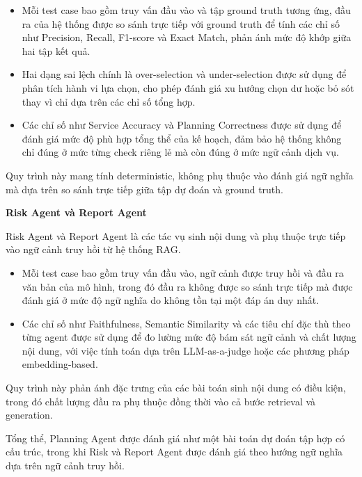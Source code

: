 \begin{itemize}
    \item Mỗi test case bao gồm truy vấn đầu vào và tập ground truth tương ứng, đầu ra của hệ thống được so sánh trực tiếp với ground truth để tính các chỉ số như Precision, Recall, F1-score và Exact Match, phản ánh mức độ khớp giữa hai tập kết quả.

    \item Hai dạng sai lệch chính là over-selection và under-selection được sử dụng để phân tích hành vi lựa chọn, cho phép đánh giá xu hướng chọn dư hoặc bỏ sót thay vì chỉ dựa trên các chỉ số tổng hợp.

    \item Các chỉ số như Service Accuracy và Planning Correctness được sử dụng để đánh giá mức độ phù hợp tổng thể của kế hoạch, đảm bảo hệ thống không chỉ đúng ở mức từng check riêng lẻ mà còn đúng ở mức ngữ cảnh dịch vụ.
\end{itemize}

Quy trình này mang tính deterministic, không phụ thuộc vào đánh giá ngữ nghĩa mà dựa trên so sánh trực tiếp giữa tập dự đoán và ground truth.

\vspace{0.5em}

\textbf{Risk Agent và Report Agent}

Risk Agent và Report Agent là các tác vụ sinh nội dung và phụ thuộc trực tiếp vào ngữ cảnh truy hồi từ hệ thống RAG.

\begin{itemize}
    \item Mỗi test case bao gồm truy vấn đầu vào, ngữ cảnh được truy hồi và đầu ra văn bản của mô hình, trong đó đầu ra không được so sánh trực tiếp mà được đánh giá ở mức độ ngữ nghĩa do không tồn tại một đáp án duy nhất.

    \item Các chỉ số như Faithfulness, Semantic Similarity và các tiêu chí đặc thù theo từng agent được sử dụng để đo lường mức độ bám sát ngữ cảnh và chất lượng nội dung, với việc tính toán dựa trên LLM-as-a-judge hoặc các phương pháp embedding-based.
\end{itemize}

Quy trình này phản ánh đặc trưng của các bài toán sinh nội dung có điều kiện, trong đó chất lượng đầu ra phụ thuộc đồng thời vào cả bước retrieval và generation.

\vspace{0.5em}

Tổng thể, Planning Agent được đánh giá như một bài toán dự đoán tập hợp có cấu trúc, trong khi Risk và Report Agent được đánh giá theo hướng ngữ nghĩa dựa trên ngữ cảnh truy hồi.



